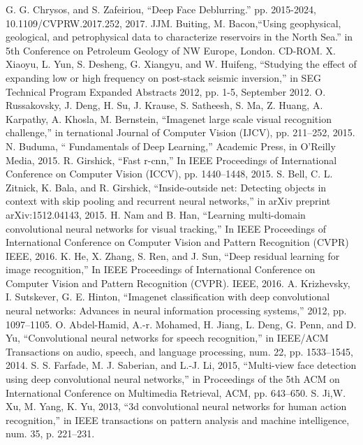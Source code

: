 \documentclass[conference]{IEEEtran}
\begin{document}
\begin{thebibliography}{00}

		G. G. Chrysos, and S. Zafeiriou, ``Deep Face Deblurring.'' pp. 2015-2024, 10.1109/CVPRW.2017.252, 2017. 
 		JJM. Buiting, M. Bacon,``Using geophysical, geological, and petrophysical data to characterize reservoirs in the North Sea.'' in 5th Conference on Petroleum Geology of NW Europe, London. CD-ROM.
  		X. Xiaoyu, L. Yun, S. Desheng, G. Xiangyu, and W. Huifeng, ``Studying the effect of expanding low or high frequency on post-stack seismic inversion,'' in SEG Technical Program Expanded Abstracts 2012, pp. 1-5, September 2012.
		O. Russakovsky, J. Deng, H. Su, J. Krause, S. Satheesh, S. Ma, Z. Huang, A. Karpathy, A. Khosla, M. Bernstein, ``Imagenet large scale visual recognition challenge,'' in ternational Journal of Computer Vision (IJCV), pp. 211–252, 2015.
  		N. Buduma, `` Fundamentals of Deep Learning,'' Academic Press, in O'Reilly Media, 2015.
		R. Girshick, ``Fast r-cnn,'' In IEEE Proceedings of International Conference on Computer Vision (ICCV), pp. 1440–1448, 2015.
		S. Bell, C. L. Zitnick, K. Bala, and R. Girshick, ``Inside-outside net: Detecting objects in context with skip pooling and recurrent neural networks,'' in arXiv preprint arXiv:1512.04143, 2015.
			H. Nam and B. Han, ``Learning multi-domain convolutional neural networks for visual tracking,'' In IEEE Proceedings of International Conference on Computer Vision and Pattern Recognition (CVPR) IEEE, 2016.
		K. He, X. Zhang, S. Ren, and J. Sun, ``Deep residual learning for image recognition,'' In IEEE Proceedings of International Conference on Computer Vision and Pattern Recognition (CVPR). IEEE, 2016.
	A. Krizhevsky, I. Sutskever, G. E. Hinton, ``Imagenet classification with deep convolutional neural networks: Advances in neural information processing systems,'' 2012, pp. 1097–1105.
	O. Abdel-Hamid, A.-r. Mohamed, H. Jiang, L. Deng, G. Penn, and D. Yu, ``Convolutional neural networks for speech recognition,'' in IEEE/ACM Transactions on audio, speech, and language processing, num. 22, pp. 1533–1545, 2014.
		S. S. Farfade, M. J. Saberian, and L.-J. Li, 2015, ``Multi-view face detection using deep convolutional neural networks,'' in Proceedings of the 5th ACM on International Conference on Multimedia Retrieval, ACM, pp. 643–650.
		S. Ji,W. Xu, M. Yang, K. Yu, 2013, ``3d convolutional neural networks for human action recognition,'' in IEEE transactions on pattern analysis and machine intelligence, num. 35, p. 221–231.

\end{thebibliography}
\end{document}
